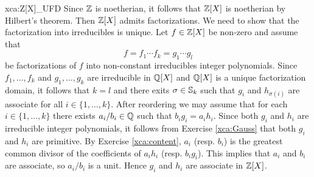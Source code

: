 \begin{sol}{xca:Z[X]_UFD}
	Since $\mathbb{Z}$ is noetherian, it follows that $\mathbb{Z}[X]$ is noetherian by Hilbert's theorem. 
	Then $\mathbb{Z}[X]$ admits factorizations. We need to show that the factorization into irreducibles is unique. 
	Let $f\in\mathbb{Z}[X]$ be non-zero and
	assume that 
	\[
	f=f_1\cdots f_k=g_1\cdots g_l
	\]
	be factorizations of $f$ into non-constant irreducibles integer polynomials. Since
	$f_1,\dots,f_k$ and $g_1,\dots,g_k$ 
	are irreducible in $\mathbb{Q}[X]$ and $\mathbb{Q}[X]$ is a unique factorization domain, it follows
	that $k=l$ and there exits $\sigma\in\mathbb{S}_k$ such that $g_i$ and $h_{\sigma(i)}$ are
	associate for all $i\in\{1,\dots,k\}$. After reordering we may assume that 
	for each $i\in\{1,\dots,k\}$ there
	exists $a_i/b_i\in\mathbb{Q}$ such that $b_ig_i=a_ih_i$. Since both $g_i$ and $h_i$ are
	irreducible integer polynomials, it follows from Exercise \ref{xca:Gauss} that
	both $g_i$ and $h_i$ are primitive. By Exercise \ref{xca:content}, 
	$a_i$ (resp. $b_i$) is the greatest common divisor of the coefficients 
	of $a_ih_i$ (resp. $b_ig_i$). This implies that $a_i$ and $b_i$ are associate, so 
	$a_i/b_i$ is a unit. Hence $g_i$ and $h_i$ are associate in $\mathbb{Z}[X]$.     
\end{sol}

%	
%	
%	

